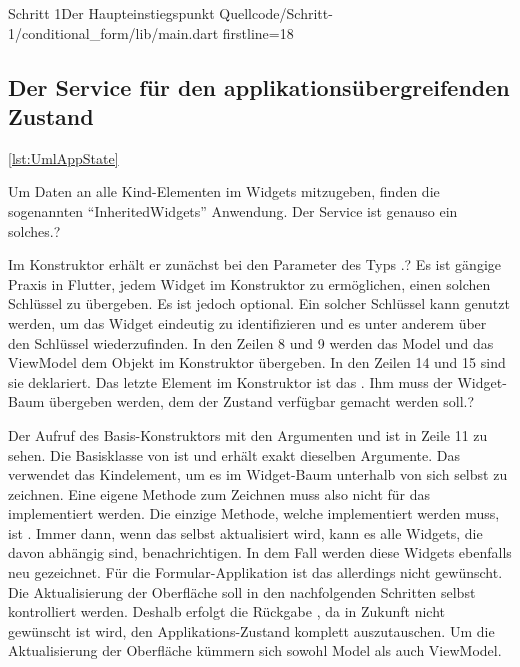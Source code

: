 \begin{alexlisting}{Schritt 1}{Der Haupteinstiegspunkt}
  {Quellcode/Schritt-1/conditional_form/lib/main.dart}
  {firstline=18}
  \label{lst:Schritt1DerHaupteinstiegspunkt}
\end{alexlisting}

\clearpage
\subsection{Der Service für den applikationsübergreifenden Zustand}


\ref{lst:UmlAppState}

Um Daten an alle Kind-Elementen im Widgets mitzugeben, finden die sogenannten \enquote{InheritedWidgets} Anwendung.
Der Service  \Lst{\ref{lst:Schritt1DerServiceAppState}} ist genauso ein solches.?

Im Konstruktor erhält er zunächst bei den Parameter des Typs  .?
Es ist gängige Praxis in Flutter, jedem Widget im Konstruktor zu ermöglichen, einen solchen Schlüssel zu übergeben.
Es ist jedoch optional.
 Ein solcher Schlüssel kann genutzt werden, um das Widget eindeutig zu identifizieren und es unter anderem über den Schlüssel wiederzufinden.
In den Zeilen 8 und 9 werden das Model und das ViewModel dem Objekt  im Konstruktor übergeben.
In den Zeilen 14 und 15 sind sie deklariert.
Das letzte Element im Konstruktor ist das .
Ihm muss der Widget-Baum übergeben werden, dem der Zustand verfügbar gemacht werden soll.?

Der Aufruf des Basis-Konstruktors mit den Argumenten  und  ist in Zeile 11 zu sehen.
Die Basisklasse von  ist  und erhält exakt dieselben Argumente.
 Das  verwendet das Kindelement, um es im Widget-Baum unterhalb von sich selbst zu zeichnen.
 Eine eigene Methode zum Zeichnen muss also nicht für das  implementiert werden.
Die einzige Methode, welche implementiert werden muss, ist  .
Immer dann, wenn das  selbst aktualisiert wird, kann es alle Widgets, die davon abhängig sind, benachrichtigen.
 In dem Fall werden diese  Widgets ebenfalls neu gezeichnet.
Für die Formular-Applikation ist das allerdings nicht gewünscht.
Die Aktualisierung der Oberfläche soll in den nachfolgenden Schritten selbst kontrolliert werden.
Deshalb erfolgt die Rückgabe , da in Zukunft nicht gewünscht ist wird, den Applikations-Zustand komplett auszutauschen.
 Um die  Aktualisierung  der Oberfläche  kümmern sich sowohl Model als auch ViewModel.

